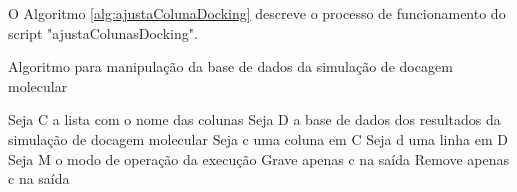 O Algoritmo \ref{alg:ajustaColunaDocking} descreve o processo de funcionamento do script "ajustaColunasDocking".

\begin{algorithm}[H]
\caption{Algoritmo para manipulação da base de dados da simulação de docagem molecular}
\label{alg:ajustaColunaDocking}
{\fontsize{10}{10}\selectfont
\begin{algorithmic}[1]
	\STATE Seja C a lista com o nome das colunas
	\STATE Seja D a base de dados dos resultados da simulação de docagem molecular
	\STATE Seja c uma coluna em C
	\STATE Seja d uma linha em D
	\STATE Seja M o modo de operação da execução
			\STATE Grave apenas c na saída
			\ENDFOR
		\ENDFOR
	\ENDIF
			\STATE Remove apenas c na saída
			\ENDFOR
		\ENDFOR
	\ENDIF
\end{algorithmic}
}
\end{algorithm}

